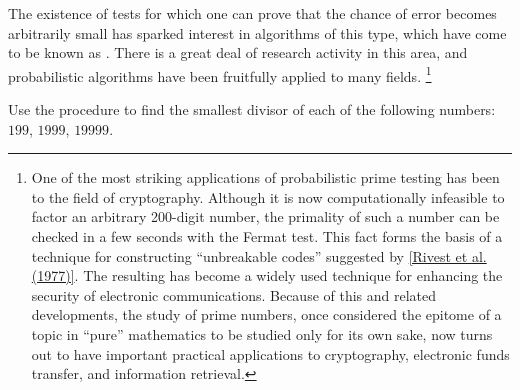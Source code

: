 The existence of tests for which one can prove that the chance of error becomes arbitrarily small has sparked interest in algorithms of this type, which have come to be known as .
There is a great deal of research activity in this area, and probabilistic algorithms have been fruitfully applied to many fields.%
\footnote{
	One of the most striking applications of probabilistic prime testing has been to the field of cryptography.
	Although it is now computationally infeasible to factor an arbitrary 200-digit number, the primality of such a number can be checked in a few seconds with the Fermat test.
	This fact forms the basis of a technique for constructing “unbreakable codes” suggested by \cref{Rivest et al. (1977)}.
	The resulting  has become a widely used technique for enhancing the security of electronic communications.
	Because of this and related developments, the study of prime numbers, once considered the epitome of a topic in “pure” mathematics to be studied only for its own sake, now turns out to have important practical applications to cryptography, electronic funds transfer, and information retrieval.
}



\begin{exercise}
	\label{Exercise 1.21}
	Use the  procedure to find the smallest divisor of each of the following numbers:
	\( 199 \), \( 1999 \), \( 19999 \).
\end{exercise}



